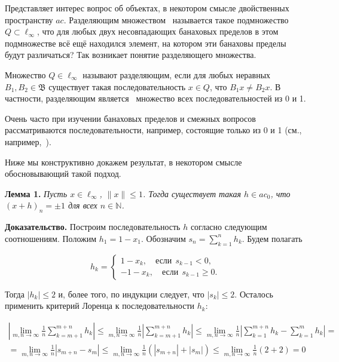 \documentclass[a4paper,14pt]{article}
\begin{document}
Представляет интерес вопрос об объектах, в некотором смысле двойственных пространству $ac$.
Разделяющим множеством~\cite[\S 3]{Semenov2014geomprops}
называется такое
подмножество $Q \subset \ell_\infty$,
что для любых двух несовпадающих банаховых пределов в этом подмножестве всё ещё находился элемент,
на котором эти банаховы пределы будут различаться?
Так возникает понятие разделяющего множества.

Множество $Q\in\ell_\infty$ называют разделяющим, если
для любых неравных $B_1, B_2\in\mathfrak{B}$ существует такая последовательность $x\in Q$,
что $B_1 x \neq B_2 x$.
В частности, разделяющим является~\cite{semenov2010characteristic} множество всех последовательностей из 0 и 1.

Очень часто при изучении банаховых пределов и смежных вопросов
рассматриваются последовательности, например, состоящие только из 0 и 1
(см., например,~\cite{connor1990almost,our-mz2019ac0,avdeev2021vestnik,avdeev2021vmzprimes}).


Ниже мы конструктивно докажем результат,
в некотором смысле обосновывающий такой подход.


\medskip

\textbf{Лемма 1.}
{\sl
	Пусть $x\in\ell_\infty$, $\|x\|\leq 1$.
	Тогда существует такая $h\in ac_0$, что $(x+h)_n = \pm 1$ для всех $n\in\mathbb N$.
}

\textbf{Доказательство.}
Построим последовательность $h$ согласно следующим соотношениям.
Положим $h_1 = 1-x_1$.
Обозначим $s_n = \sum_{k=1}^n h_k$. Будем полагать

$$
	h_k = \begin{cases}
		1-x_k, \quad\mbox{если}~~ s_{k-1} < 0,
		\\
		-1 - x_k,\quad\mbox{если}~~ s_{k-1} \geq 0
		.
	\end{cases}
$$

Тогда $|h_k| \leq 2$ и, более того, по индукции следует, что $|s_k| \leq 2$. Осталось применить критерий Лоренца к последовательности $h_k$:

\begin{multline*}
	\left|\lim_{m,n\to \infty} \frac{1}{n} \sum_{k=m+1}^{m+n} h_k\right| \leq
	\lim_{m,n\to \infty} \frac{1}{n} \left|\sum_{k=m+1}^{m+n} h_k\right| \leq
	\lim_{m,n\to \infty} \frac{1}{n} \left|\sum_{k=1}^{m+n} h_k - \sum_{k=1}^{m} h_k  \right| =
	\\=
	\lim_{m,n\to \infty} \frac{1}{n} \left|s_{m+n} - s_{m}  \right| \leq
	\lim_{m,n\to \infty} \frac{1}{n} (|s_{m+n}| + |s_{m} |) \leq
	\lim_{m,n\to \infty} \frac{1}{n} (2 + 2) =0
\end{multline*}
\end{document}
